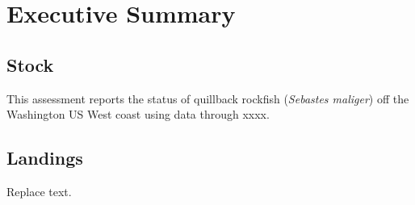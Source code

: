 \documentclass[11pt,
  english,
  a4paper,
]{article}
\begin{document}
\newcommand{\lt}{\ensuremath <}
\newcommand{\gt}{\ensuremath >}


\pagebreak
{}
\setcounter{page}{1}

\renewcommand{\thetable}{\roman{table}}
\renewcommand{\thefigure}{\roman{figure}}


\hypertarget{executive-summary}{%
\section*{Executive Summary}\label{executive-summary}}

\leavevmode\tagmcend\tagstructend


\hypertarget{stock}{%
\subsection*{Stock}\label{stock}}

\leavevmode\tagmcend\tagstructend


This assessment reports the status of quillback rockfish (\emph{Sebastes maliger}) off the Washington US West coast using data through xxxx.

\leavevmode\tagmcend\tagstructend\par


\hypertarget{landings}{%
\subsection*{Landings}\label{landings}}

\leavevmode\tagmcend\tagstructend


Replace text.

\leavevmode\tagmcend\tagstructend\par

\end{document}
